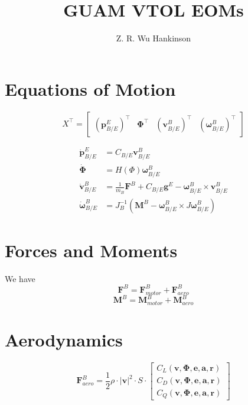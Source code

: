 \documentclass[11pt]{amsart}
\title{GUAM VTOL EOMs}
\author{Z. R. Wu Hankinson}
\renewcommand{\vec}{\mathbf}
\begin{document}
\maketitle

\section{Equations of Motion}
\begin{equation}
	X^\top = \begin{bmatrix}
	    \left( \vec{p}_{B/E}^E \right)^\top &
		\vec{\Phi}^\top &
        \left( \vec{v}_{B/E}^B \right)^\top &
        \left( \vec{\omega}_{B/E}^B \right)^\top
	\end{bmatrix}
\end{equation}

\begin{align}
	\dot{\vec{p}}_{B/E}^E &= C_{B/E}  \vec{v}_{B/E}^B \\
    \dot{\vec{\Phi}} &= H(\Phi) \vec{\omega}_{B/E}^B \\
    \dot{\vec{v}}_{B/E}^B &= \frac{1}{m_B}\boldsymbol{F}^B + C_{B/E}\vec{g}^E- \vec{\omega}_{B/E}^B \times \vec{v}_{B/E}^B \\
    \dot{\vec{\omega}}_{B/E}^B &= J_B^{-1} \left(\boldsymbol{M}^B - \vec{\omega}_{B/E}^B \times J \vec{\omega}_{B/E}^B\right)
\end{align}
\section{Forces and Moments}
We have
$$
\boldsymbol{F}^B = \vec{F}_{motor}^B + \vec{F}_{aero}^B
$$
$$
\boldsymbol{M}^B = \vec{M}_{motor}^B + \vec{M}_{aero}^B
$$

\section{Aerodynamics}
\begin{equation}
	\vec{F}_{aero}^B = \frac{1}{2}\rho \cdot \left|\vec{v}\right|^2 \cdot S \cdot
	\begin{bmatrix}
		C_L(\vec{v}, \vec{\Phi}, \vec{e}, \vec{a}, \vec{r}) \\
		C_D(\vec{v}, \vec{\Phi}, \vec{e}, \vec{a}, \vec{r}) \\
		C_Q(\vec{v}, \vec{\Phi}, \vec{e}, \vec{a}, \vec{r})
\end{bmatrix}
\end{equation}
\end{document}
